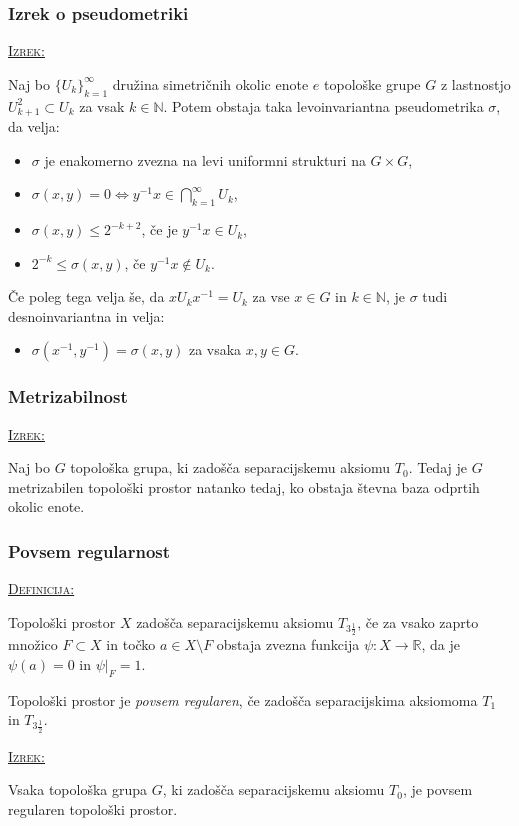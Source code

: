 \documentclass[a4paper, 12pt]{beamer}
\newenvironment{matematika}[1]{
\textcolor{bostonuniversityred}{\underline{\textsc{#1:}}}
}{
}
\begin{document}
\begin{frame}
\frametitle{Izrek o pseudometriki}
\begin{matematika}{Izrek}
	Naj bo $\{ U_k \}_{k=1}^{\infty}$ družina simetričnih okolic enote $e$ topo\-loš\-ke grupe $G$ z lastnostjo $U_{k+1}^2 \subset U_k$ za vsak $k\in\mathbb{N}$. Potem obstaja taka levoinvariantna pseudometrika $\sigma$, da velja:
	\begin{itemize}[label=]
		\item $\sigma$ je enakomerno zvezna na levi uniformni strukturi na $G \times G$,
		\item $\sigma (x, y) = 0 \iff y^{-1}x \in \bigcap_{k=1}^{\infty}U_k$,
		\item $\sigma (x, y) \leq 2^{-k+2}$, če je $y^{-1}x \in U_k$,
		\item $2^{-k} \leq \sigma (x, y)$, če $y^{-1}x \notin U_k$.
	\end{itemize}
	Če poleg tega velja še, da $x U_k x^{-1} = U_k$ za vse $x \in G$ in $k\in\mathbb{N}$, je $\sigma$ tudi desnoinvariantna in velja:
	\begin{itemize}[label=]
		\item $\sigma (x^{-1}, y^{-1}) = \sigma (x, y)$ za vsaka $x, y \in G$.
	\end{itemize}
\end{matematika}
\end{frame}

\begin{frame}
\frametitle{Metrizabilnost}
\begin{matematika}{Izrek}
Naj bo $G$ topološka grupa, ki zadošča separacijskemu aksiomu $T_0$. Tedaj je $G$ metrizabilen topološki prostor natanko tedaj, ko obstaja števna baza odprtih okolic enote.
\end{matematika}
\end{frame}

\begin{frame}
\frametitle{Povsem regularnost}
\begin{matematika}{Definicija}
Topološki prostor $X$ zadošča separacijskemu aksiomu $T_{3\frac{1}{2}}$, če za vsako zaprto množico $F \subset X$ in točko $a \in X \setminus F$ obstaja zvezna funkcija $\psi: X \to \mathbb{R}$, da je $\psi(a) = 0$ in $\psi|_F = 1$.
\end{matematika}\newline

Topološki prostor je \emph{povsem regularen}, če zadošča separacijskima aksiomoma $T_1$ in $T_{3\frac{1}{2}}$. \newline

\begin{matematika}{Izrek}
Vsaka topološka grupa $G$, ki zadošča separacijskemu aksiomu $T_0$, je povsem regularen topološki prostor.
\end{matematika}
\end{frame}
\end{document}
